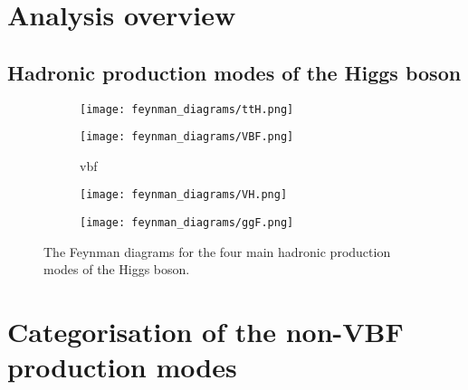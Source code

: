 




\section{Analysis overview}
\label{sec:htoinv_overview}




\subsection{Hadronic production modes of the Higgs boson}
\label{subsec:htoinv_production_modes}

\begin{figure}[htbp]
    \centering
    \begin{subfigure}[b]{0.45\textwidth}
        \texttt{[image: feynman\_diagrams/ttH.png]}
        \caption{\ttH}
    \end{subfigure}
    \hfill
    \begin{subfigure}[b]{0.45\textwidth}
        \texttt{[image: feynman\_diagrams/VBF.png]}
        \caption{\acrshort{vbf}}
    \end{subfigure}
    \begin{subfigure}[b]{0.45\textwidth}
        \texttt{[image: feynman\_diagrams/VH.png]}
        \caption{\VH}
    \end{subfigure}
    \hfill
    \begin{subfigure}[b]{0.45\textwidth}
        \texttt{[image: feynman\_diagrams/ggF.png]}
        \caption{\ggF}
    \end{subfigure}
\caption[The Feynman diagrams for the four main hadronic production modes of the Higgs boson]{The Feynman diagrams for the four main hadronic production modes of the Higgs boson.}
\label{fig:higgs_feynman_diagrams}
\end{figure}




\section{Categorisation of the non-VBF production modes}
\label{sec:htoinv_categorisation}


